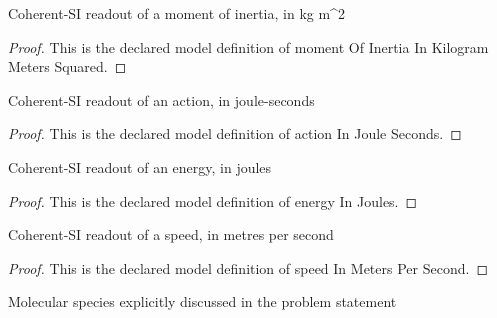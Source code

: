 \begin{definition}
  \label{def:physics:phyx-mini-0628:phyxminiproblems-problemphyxmini0628-momentofinertiainkilogrammeterssquared}
  Coherent-SI readout of a moment of inertia, in kg m\textasciicircum{}2
\end{definition}
\begin{proof}
  This is the declared model definition of moment Of Inertia In Kilogram Meters Squared.
\end{proof}
\begin{definition}
  \label{def:physics:phyx-mini-0628:phyxminiproblems-problemphyxmini0628-actioninjouleseconds}
  Coherent-SI readout of an action, in joule-seconds
\end{definition}
\begin{proof}
  This is the declared model definition of action In Joule Seconds.
\end{proof}
\begin{definition}
  \label{def:physics:phyx-mini-0628:phyxminiproblems-problemphyxmini0628-energyinjoules}
  Coherent-SI readout of an energy, in joules
\end{definition}
\begin{proof}
  This is the declared model definition of energy In Joules.
\end{proof}
\begin{definition}
  \label{def:physics:phyx-mini-0628:phyxminiproblems-problemphyxmini0628-speedinmeterspersecond}
  Coherent-SI readout of a speed, in metres per second
\end{definition}
\begin{proof}
  This is the declared model definition of speed In Meters Per Second.
\end{proof}
\begin{definition}
  \label{def:physics:phyx-mini-0628:phyxminiproblems-problemphyxmini0628-molecularspecies}
  Molecular species explicitly discussed in the problem statement
\end{definition}
